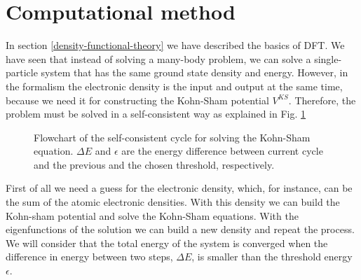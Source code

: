 \section{Computational method}

In section \ref{density-functional-theory} we have described the basics of DFT. We have seen that instead of solving a many-body problem, we can solve a single-particle system that has the same ground state density and 
energy. However, in the formalism the electronic density is the input and output at the same time, because we need it for constructing the Kohn-Sham potential $V^{KS}$. Therefore, the problem must be solved in a 
self-consistent way as explained in Fig. \ref{self-consistent-cycle} 
\begin{figure}[h]
\begin{center}
\end{center}
\caption[DFT self-consistent cycle]{Flowchart of the self-consistent cycle for solving the Kohn-Sham equation. $\Delta E$ and $\epsilon$ are the energy difference between current cycle and the previous and the chosen threshold, respectively.}
\label{self-consistent-cycle}
\end{figure}
First of all we need a guess for the electronic density, which, for instance, can be the sum of the atomic electronic densities. With this density we can build the 
Kohn-sham potential and solve the Kohn-Sham equations. With the eigenfunctions of the solution we can build a new density and repeat the process. We will consider that the total energy of the system is converged when 
the difference in energy between two steps, $\Delta E$, is smaller than the threshold energy $\epsilon$. \\

